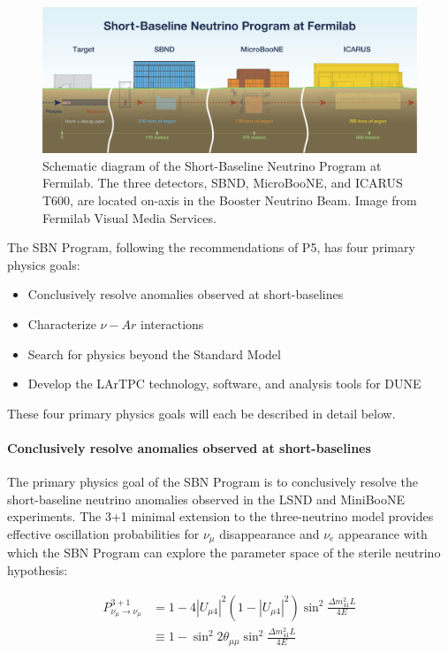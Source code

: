 \begin{figure}
    \centering
    \includegraphics[width=\textwidth]{figures/introduction/sbn_program_diagram.jpg}
    \caption{Schematic diagram of the Short-Baseline Neutrino Program at Fermilab. The three detectors, SBND, MicroBooNE, and ICARUS T600, are located on-axis in the Booster Neutrino Beam. Image from Fermilab Visual Media Services.}
    \label{fig:sbn_program_diagram}
\end{figure}

The SBN Program, following the recommendations of P5, has four primary physics goals:

\begin{itemize}
    \item Conclusively resolve anomalies observed at short-baselines
    \item Characterize $\nu-Ar$ interactions
    \item Search for physics beyond the Standard Model
    \item Develop the LArTPC technology, software, and analysis tools for DUNE
\end{itemize}

\noindent
These four primary physics goals will each be described in detail below.

\paragraph*{Conclusively resolve anomalies observed at short-baselines}
The primary physics goal of the SBN Program is to conclusively resolve the short-baseline neutrino anomalies observed in the LSND and MiniBooNE experiments. The 3+1 minimal extension to the three-neutrino model provides effective oscillation probabilities for $\nu_\mu$ disappearance and $\nu_e$ appearance with which the SBN Program can explore the parameter space of the sterile neutrino hypothesis:

\begin{equation}
    \begin{aligned}
        P_{\nu_\mu \rightarrow \nu_\mu}^{3+1} & = 1 - 4 \left| U_{\mu 4} \right|^2 \left( 1 - \left| U_{\mu 4} \right|^2 \right) \sin^2{\frac{\Delta m_{41}^2L}{4E}}\\
        & \equiv 1 - \sin^2{2\theta_{\mu\mu}} \sin^2{\frac{\Delta m_{41}^2L}{4E}}
    \end{aligned}
    \label{eq:sbn_sterile_oscillation_probability_numu_disappearance}
\end{equation}


